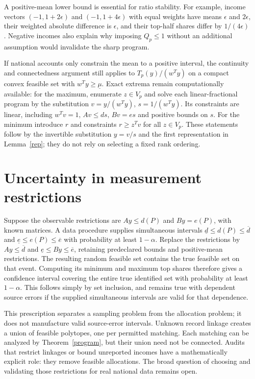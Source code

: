 \documentclass[11pt]{article}
\theoremstyle{remark}\newtheorem{remark}[theorem]{Remark}
\begin{document}
A positive-mean lower bound is essential for ratio stability. For example, income vectors $(-1,1+2\epsilon)$ and $(-1,1+4\epsilon)$ with equal weights have means $\epsilon$ and $2\epsilon$, their weighted absolute difference is $\epsilon$, and their top-half shares differ by $1/(4\epsilon)$. Negative incomes also explain why imposing $Q_p\leq1$ without an additional assumption would invalidate the sharp program.

If national accounts only constrain the mean to a positive interval, the continuity and connectedness argument still applies to $T_p(y)/(w^Ty)$ on a compact convex feasible set with $w^Ty\geq\underline\mu$. Exact extrema remain computationally available: for the maximum, enumerate $z\in V_p$ and solve each linear-fractional program by the substitution $v=y/(w^Ty)$, $s=1/(w^Ty)$. Its constraints are linear, including $w^Tv=1$, $Av\leq ds$, $Bv=es$ and positive bounds on $s$. For the minimum introduce $r$ and constraints $r\geq z^Tv$ for all $z\in V_p$. These statements follow by the invertible substitution $y=v/s$ and the first representation in Lemma~\ref{rep}; they do not rely on selecting a fixed rank ordering.

\section{Uncertainty in measurement restrictions}
Suppose the observable restrictions are $Ay\leq d(P)$ and $By=e(P)$, with known matrices. A data procedure supplies simultaneous intervals
$\underline d\leq d(P)\leq\overline d$ and
$\underline e\leq e(P)\leq\overline e$ with probability at least $1-\alpha$. Replace the restrictions by
$Ay\leq\overline d$ and
$\underline e\leq By\leq\overline e$, retaining predeclared bounds and positive-mean restrictions. The resulting random feasible set contains the true feasible set on that event. Computing its minimum and maximum top shares therefore gives a confidence interval covering the entire true identified set with probability at least $1-\alpha$. This follows simply by set inclusion, and remains true with dependent source errors if the supplied simultaneous intervals are valid for that dependence.

This prescription separates a sampling problem from the allocation problem; it does not manufacture valid source-error intervals. Unknown record linkage creates a union of feasible polytopes, one per permitted matching. Each matching can be analyzed by Theorem~\ref{program}, but their union need not be connected. Audits that restrict linkages or bound unreported incomes have a mathematically explicit role: they remove feasible allocations. The broad question of choosing and validating those restrictions for real national data remains open.
\end{document}
